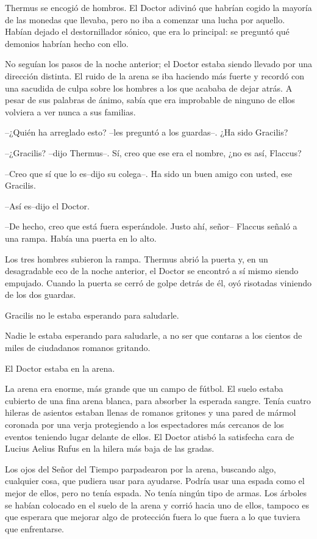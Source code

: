 Thermus se encogió de hombros. El Doctor adivinó que habrían cogido la
mayoría de las monedas que llevaba, pero no iba a comenzar una lucha por
aquello. Habían dejado el destornillador sónico, que era lo principal:
se preguntó qué demonios habrían hecho con ello.

No seguían los pasos de la noche anterior; el Doctor estaba siendo
llevado por una dirección distinta. El ruido de la arena se iba haciendo
más fuerte y recordó con una sacudida de culpa sobre los hombres a los
que acababa de dejar atrás. A pesar de sus palabras de ánimo, sabía que
era improbable de ninguno de ellos volviera a ver nunca a sus familias.

--¿Quién ha arreglado esto? --les preguntó a los guardas--. ¿Ha sido
Gracilis?

--¿Gracilis? --dijo Thermus--. Sí, creo que ese era el nombre, ¿no es
así, Flaccus?

--Creo que sí que lo es--dijo su colega--. Ha sido un buen amigo con
usted, ese Gracilis.

--Así es--dijo el Doctor.

--De hecho, creo que está fuera esperándole. Justo ahí, señor-- Flaccus
señaló a una rampa. Había una puerta en lo alto.

Los tres hombres subieron la rampa. Thermus abrió la puerta y, en un
desagradable eco de la noche anterior, el Doctor se encontró a sí mismo
siendo empujado. Cuando la puerta se cerró de golpe detrás de él, oyó
risotadas viniendo de los dos guardas.

Gracilis no le estaba esperando para saludarle.

Nadie le estaba esperando para saludarle, a no ser que contaras a los
cientos de miles de ciudadanos romanos gritando.

El Doctor estaba en la arena.

La arena era enorme, más grande que un campo de fútbol. El suelo estaba
cubierto de una fina arena blanca, para absorber la esperada sangre.
Tenía cuatro hileras de asientos estaban llenas de romanos gritones y
una pared de mármol coronada por una verja protegiendo a los
espectadores más cercanos de los eventos teniendo lugar delante de
ellos. El Doctor atisbó la satisfecha cara de Lucius Aelius Rufus en la
hilera más baja de las gradas.

Los ojos del Señor del Tiempo parpadearon por la arena, buscando algo,
cualquier cosa, que pudiera usar para ayudarse. Podría usar una espada
como el mejor de ellos, pero no tenía espada. No tenía ningún tipo de
armas. Los árboles se habían colocado en el suelo de la arena y corrió
hacia uno de ellos, tampoco es que esperara que mejorar algo de
protección fuera lo que fuera a lo que tuviera que enfrentarse.

